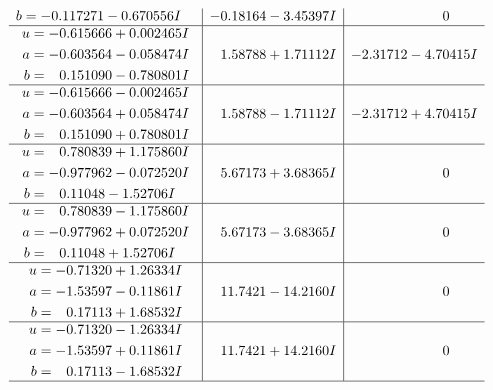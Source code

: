 \documentclass[1p]{elsarticle_modified}
\theoremstyle{definition}
\begin{document}
$$\begin{array}{c|c|c}
\begin{aligned}
b &= -0.117271 - 0.670556 I\end{aligned}
 & -0.18164 - 3.45397 I & \phantom{-0.000000 } 0 \\ \hline\begin{aligned}
u &= -0.615666 + 0.002465 I \\
a &= -0.603564 - 0.058474 I \\
b &= \phantom{-}0.151090 - 0.780801 I\end{aligned}
 & \phantom{-}1.58788 + 1.71112 I & -2.31712 - 4.70415 I \\ \hline\begin{aligned}
u &= -0.615666 - 0.002465 I \\
a &= -0.603564 + 0.058474 I \\
b &= \phantom{-}0.151090 + 0.780801 I\end{aligned}
 & \phantom{-}1.58788 - 1.71112 I & -2.31712 + 4.70415 I \\ \hline\begin{aligned}
u &= \phantom{-}0.780839 + 1.175860 I \\
a &= -0.977962 - 0.072520 I \\
b &= \phantom{-}0.11048 - 1.52706 I\end{aligned}
 & \phantom{-}5.67173 + 3.68365 I & \phantom{-0.000000 } 0 \\ \hline\begin{aligned}
u &= \phantom{-}0.780839 - 1.175860 I \\
a &= -0.977962 + 0.072520 I \\
b &= \phantom{-}0.11048 + 1.52706 I\end{aligned}
 & \phantom{-}5.67173 - 3.68365 I & \phantom{-0.000000 } 0 \\ \hline\begin{aligned}
u &= -0.71320 + 1.26334 I \\
a &= -1.53597 - 0.11861 I \\
b &= \phantom{-}0.17113 + 1.68532 I\end{aligned}
 & \phantom{-}11.7421 - 14.2160 I & \phantom{-0.000000 } 0 \\ \hline\begin{aligned}
u &= -0.71320 - 1.26334 I \\
a &= -1.53597 + 0.11861 I \\
b &= \phantom{-}0.17113 - 1.68532 I\end{aligned}
 & \phantom{-}11.7421 + 14.2160 I & \phantom{-0.000000 } 0\\
 \hline 
 \end{array}$$\newpage$$\begin{array}{c|c|c}  

\end{array}$$
\end{document}
